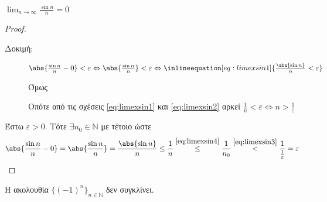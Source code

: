 \documentclass[main.tex]{subfiles}
\begin{document}
\begin{examples}
\begin{enumerate}[i)]
        \item $ \lim_{n \to \infty} \frac{\sin{n}}{n} = 0 $

            \begin{proof}
            \item {}
                \begin{description}
                    \item[Δοκιμή:] $ \abs{\frac{\sin{n}}{n} - 0} < 
                        \varepsilon \Leftrightarrow \abs{\frac{\sin{n}}{n}}
                        < \varepsilon \Leftrightarrow 
                        \inlineequation[eq:limexsin1]{\frac{\abs{\sin{n}}}
                        {n} < \varepsilon} $

                        Όμως

                        Οπότε από τις σχέσεις \eqref{eq:limexsin1} και 
                        \eqref{eq:limexsin2} αρκεί $ \frac{1}{n} < 
                        \varepsilon \Leftrightarrow n > \frac{1}{
                        \varepsilon} $
                \end{description}

                Έστω $ \varepsilon >0 $. Τότε $ \exists n_{0} \in \mathbb{N}
                $ με  τέτοιο ώστε
                \[
                    \abs{\frac{\sin{n}}{n} - 0} =  \abs{\frac{\sin{n}}{n}} =
                    \frac{\abs{\sin{n}}}{n} \leq \frac{1}{n}
                    \overset{\eqref{eq:limexsin4}}{\leq}  \frac{1}{n_{0}}
                    \overset{\eqref{eq:limexsin3}}{<}
                    \frac{1}{\frac{1}{\varepsilon}
                } = \varepsilon 
                 \] 
            \end{proof}
    \end{enumerate}
\end{examples}

\begin{prop}
    Η ακολουθία $ \{ (-1)^{n} \}_{n \in \mathbb{N}} $ δεν συγκλίνει.
\end{prop}
\end{document}
